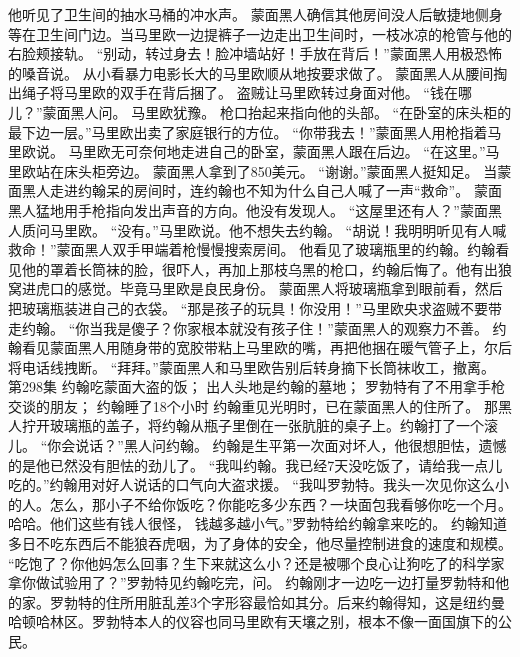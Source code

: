 \documentclass[a4paper,12pt,UTF8,twoside]{ctexbook}
\begin{document}
        他听见了卫生间的抽水马桶的冲水声。  
        蒙面黑人确信其他房间没人后敏捷地侧身等在卫生间门边。当马里欧一边提裤子一边走出卫生间时，一枝冰凉的枪管与他的右脸颊接轨。  
        “别动，转过身去！脸冲墙站好！手放在背后！”蒙面黑人用极恐怖的嗓音说。  
        从小看暴力电影长大的马里欧顺从地按要求做了。  
        蒙面黑人从腰间掏出绳子将马里欧的双手在背后捆了。  
        盗贼让马里欧转过身面对他。  
        “钱在哪儿？”蒙面黑人问。  
        马里欧犹豫。  
        枪口抬起来指向他的头部。  
        “在卧室的床头柜的最下边一层。”马里欧出卖了家庭银行的方位。  
        “你带我去！”蒙面黑人用枪指着马里欧说。  
        马里欧无可奈何地走进自己的卧室，蒙面黑人跟在后边。  
        “在这里。”马里欧站在床头柜旁边。  
        蒙面黑人拿到了850美元。        
        “谢谢。”蒙面黑人挺知足。  
        当蒙面黑人走进约翰呆的房间时，连约翰也不知为什么自己人喊了一声“救命”。  
        蒙面黑人猛地用手枪指向发出声音的方向。他没有发现人。  
        “这屋里还有人？”蒙面黑人质问马里欧。  
        “没有。”马里欧说。他不想失去约翰。  
        “胡说！我明明听见有人喊救命！”蒙面黑人双手甲端着枪慢慢搜索房间。  
        他看见了玻璃瓶里的约翰。约翰看见他的罩着长筒袜的脸，很吓人，再加上那枝乌黑的枪口，约翰后悔了。他有出狼窝进虎口的感觉。毕竟马里欧是良民身份。  
        蒙面黑人将玻璃瓶拿到眼前看，然后把玻璃瓶装进自己的衣袋。  
        “那是孩子的玩具！你没用！”马里欧央求盗贼不要带走约翰。  
        “你当我是傻子？你家根本就没有孩子住！”蒙面黑人的观察力不善。  
        约翰看见蒙面黑人用随身带的宽胶带粘上马里欧的嘴，再把他捆在暖气管子上，尔后将电话线拽断。  
        “拜拜。”蒙面黑人和马里欧告别后转身摘下长筒袜收工，撤离。   第298集  
        约翰吃蒙面大盗的饭；  
        出人头地是约翰的墓地；  
        罗勃特有了不用拿手枪交谈的朋友；  
        约翰睡了18个小时    
        约翰重见光明时，已在蒙面黑人的住所了。  
        那黑人拧开玻璃瓶的盖子，将约翰从瓶子里倒在一张肮脏的桌子上。约翰打了一个滚儿。  
        “你会说话？”黑人问约翰。  
        约翰是生平第一次面对坏人，他很想胆怯，遗憾的是他已然没有胆怯的劲儿了。  
        “我叫约翰。我已经7天没吃饭了，请给我一点儿吃的。”约翰用对好人说话的口气向大盗求援。  
        “我叫罗勃特。我头一次见你这么小的人。怎么，那小子不给你饭吃？你能吃多少东西？一块面包我看够你吃一个月。哈哈。他们这些有钱人很怪，        钱越多越小气。”罗勃特给约翰拿来吃的。  
        约翰知道多日不吃东西后不能狼吞虎咽，为了身体的安全，他尽量控制进食的速度和规模。  
        “吃饱了？你他妈怎么回事？生下来就这么小？还是被哪个良心让狗吃了的科学家拿你做试验用了？”罗勃特见约翰吃完，问。  
        约翰刚才一边吃一边打量罗勃特和他的家。罗勃特的住所用脏乱差3个字形容最恰如其分。后来约翰得知，这是纽约曼哈顿哈林区。罗勃特本人的仪容也同马里欧有天壤之别，根本不像一面国旗下的公民。  
\end{document}
